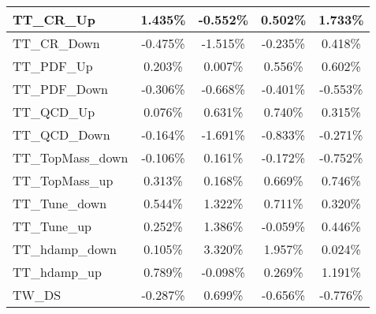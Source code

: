 \begin{table}[]
{\begin{tabular}{|l|c|c|c|c|}
TT\_CR\_Up                        & 1.435\%                           & -0.552\%                          & 0.502\%                         & 1.733\%                          \\ \hline        
TT\_CR\_Down                      & -0.475\%                         & -1.515\%                        & -0.235\%                       & 0.418\%                        \\ \hline        
TT\_PDF\_Up                        & 0.203\%                         & 0.007\%                         & 0.556\%                        & 0.602\%                       \\ \hline    
TT\_PDF\_Down                      & -0.306\%                       & -0.668\%                       & -0.401\%                      & -0.553\%                       \\ \hline    
TT\_QCD\_Up                        & 0.076\%                         & 0.631\%                         & 0.740\%                        & 0.315\%                       \\ \hline    
TT\_QCD\_Down                      & -0.164\%                       & -1.691\%                       & -0.833\%                      & -0.271\%                       \\ \hline    
TT\_TopMass\_down                      & -0.106\%                       & 0.161\%                       & -0.172\%                      & -0.752\%                       \\ \hline    
TT\_TopMass\_up                      & 0.313\%                       & 0.168\%                       & 0.669\%                      & 0.746\%                       \\ \hline        
TT\_Tune\_down            & 0.544\%             & 1.322\%             & 0.711\%            & 0.320\%             \\ \hline      
TT\_Tune\_up              & 0.252\%               & 1.386\%               & -0.059\%              & 0.446\%               \\ \hline    
TT\_hdamp\_down                  & 0.105\%                         & 3.320\%                      & 1.957\%                        & 0.024\%                   \\ \hline
TT\_hdamp\_up                    & 0.789\%                           & -0.098\%                        & 0.269\%                          & 1.191\%                     \\ \hline
TW\_DS                      & -0.287\%                             & 0.699\%                          & -0.656\%                            & -0.776\%                       \\ \hline

\end{tabular}}
\end{table}
